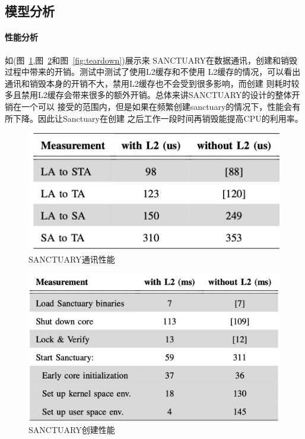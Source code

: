\subsection{模型分析}

\paragraph{性能分析}
如(图~\ref{fig:datacom},图~\ref{fig:setup}和图~\ref{fig:teardown})展示来
SANCTUARY在数据通讯，创建和销毁过程中带来的开销。测试中测试了使用L2缓存和不使用
L2缓存的情况，可以看出通讯和销毁本身的开销不大，禁用L2缓存也不会受到很多影响，而创建
则耗时较多且禁用L2缓存会带来很多的额外开销。总体来讲SANCTUARY的设计的整体开销在一个可以
接受的范围内，但是如果在频繁创建sanctuary的情况下，性能会有所下降。因此让Sanctuary在创建
之后工作一段时间再销毁能提高CPU的利用率。

\begin{figure}
    \centering
    \includegraphics[scale=0.45]{Figures/trustzone/datacom.png}
    \decoRule
    \caption{SANCTUARY通讯性能}
    \label{fig:datacom}
\end{figure}

\begin{figure}
    \centering
    \includegraphics[scale=0.45]{Figures/trustzone/setup.png}
    \decoRule
    \caption{SANCTUARY创建性能}
    \label{fig:setup}
\end{figure}

